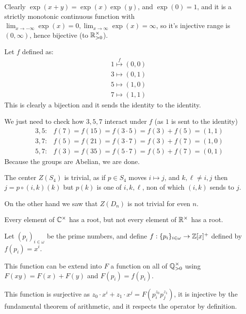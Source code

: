 \begin{cExercise}[][][author][1]
\begin{cPart}
		Clearly $\exp(x+y)=\exp(x)\exp(y)$, and $\exp(0)=1$, and it is a strictly monotonic continuous function with $\lim_{x\to-\infty}\exp(x)=0, \lim_{x\to\infty}\exp(x)=\infty$, so it's injective range is $(0,\infty)$, hence bijective (to $\mathbb R_{>0}^\times$).
	\end{cPart}
	\begin{cPart}
		Let $f$ defined as:
		\begin{align*}
			&1\overset{f}{\mapsto} (0,0)\\
			&3\mapsto (0,1)\\
			&5\mapsto (1,0)\\
			&7\mapsto (1,1)\
		\end{align*}
		This is clearly a bijection and it sends the identity to the identity.
		
		We just need to check how $3,5,7$ interact under $f$ (as $1$ is sent to the identity)
		\begin{align*}
			&3,5:&f(7)=f(15)=f(3\cdot 5)=f(3)+f(5)=(1,1)\\
			&3,7:&f(5)=f(21)=f(3\cdot 7)=f(3)+f(7)=(1,0)\\
			&5,7:&f(3)=f(35)=f(5\cdot 7)=f(5)+f(7)=(0,1)
		\end{align*}
		Because the groups are Abelian, we are done.
	\end{cPart}
	\begin{cPart}
		The center $Z(S_4)$ is trivial, as if $p\in S_4$ moves $i\mapsto j$, and $k,\ell\ne i,j$ then $j=p\circ(i,k)(k)$ but $p(k)$ is one of $i,k,\ell$, non of which $(i,k)$ sends to $j$.
		
		On the other hand we saw that $Z(D_n)$ is not trivial for even $n$.
	\end{cPart}
	\begin{cPart}
		Every element of $\mathbb C^\times$ has a root, but not every element of $\mathbb R^\times$ has a root.
	\end{cPart}
	\begin{cPart}[Bonus]
		Let $(p_i)_{i\in\omega}$ be the prime numbers, and define $f:\{p_i\}_{i\in\omega}\to \mathbb Z[x]^+$ defined by $f(p_i)=x^i$.
		
		This function can be extend into $F$ a function on all of $\mathbb Q^\times_{>0}$ using $F(xy)=F(x)+F(y)$ and $F(p_i)=f(p_i)$.
		
		This function is surjective as $z_0\cdot x^i+z_1\cdot x^j=F(p_i^{z_0}p_j^{z_1})$, it is injective by the fundamental theorem of arithmetic, and it respects the operator by definition.
	\end{cPart}
\end{cExercise}
